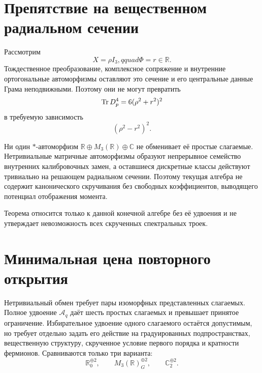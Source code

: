 \section{Препятствие на вещественном радиальном сечении}

Рассмотрим
\begin{equation}
 X=\rho I_3,qquad\Phi=r\in\mathbb R.
 \label{eq:v5-twist-radial-fixed-slice}
\end{equation}
Тождественное преобразование, комплексное сопряжение и внутренние
ортогональные автоморфизмы оставляют это сечение и его центральные данные
Грама неподвижными. Поэтому они не могут превратить
\begin{equation}\operatorname{Tr} D_p^4=6(\rho^2+r^2)^2\end{equation}
в требуемую зависимость
\begin{equation}(\rho^2-r^2)^2.\end{equation}

\begin{theorem}
Ни один \(*\)-автоморфизм
\(\mathbb R\oplus M_3(\mathbb R)\oplus\mathbb C\) не обменивает её простые
слагаемые. Нетривиальные матричные автоморфизмы образуют непрерывное семейство
внутренних калибровочных замен, а оставшиеся дискретные классы действуют
тривиально на решающем радиальном сечении. Поэтому текущая алгебра не
содержит канонического скручивания без свободных коэффициентов, выводящего
потенциал отображения момента.
\end{theorem}

Теорема относится только к данной конечной алгебре без её удвоения и не
утверждает невозможность всех скрученных спектральных троек.

\section{Минимальная цена повторного открытия}

Нетривиальный обмен требует пары изоморфных представленных слагаемых. Полное
удвоение \(\mathcal A_q\) даёт шесть простых слагаемых и превышает принятое
ограничение. Избирательное удвоение одного слагаемого остаётся допустимым,
но требует отдельно задать его действие на градуированных подпространствах,
вещественную структуру, скрученное условие первого порядка и кратности
фермионов. Сравниваются только три варианта:
\begin{equation}
 \mathbb R_0^{\oplus2},\qquad
 M_3(\mathbb R)_G^{\oplus2},\qquad
 \mathbb C_2^{\oplus2}.
\end{equation}

